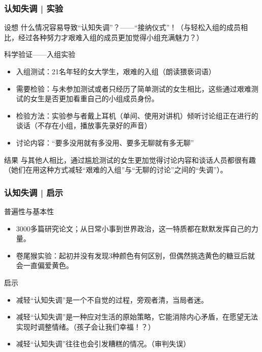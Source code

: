 \begin{frame}
  \frametitle{认知失调 | 实验}
  \begin{block}{设想}
什么情况容易导致“认知失调”？——“接纳仪式”！（与轻松入组的成员相比，经过各种努力才艰难入组的成员更加觉得小组充满魅力？）
  \end{block}
  \vspace{-0.6em}
  \pause
  \begin{block}{科学验证——入组实验}
    \begin{itemize}
      \item 入组测试：21名年轻的女大学生，艰难的入组（朗读猥亵词语）
      \item 需要检验：与未参加测试或者只经历了简单测试的女生相比，这些通过艰难测试的女生是否更加看重自己的小组成员身份。
      \item 检验方法：实验参与者戴上耳机（单间、使用对讲机）倾听讨论组正在进行的谈话（不存在小组，播放事先录好的声音）
      \item 讨论内容：“要多没用就有多没用、要多无聊就有多无聊”
    \end{itemize}
  \end{block}
  \vspace{-0.6em}
  \pause
  \begin{block}{结果}
与其他人相比，通过尴尬测试的女生更加觉得讨论内容和谈话人员都很有趣（她们在用这种方式减轻“艰难的入组”与“无聊的讨论”之间的“失调”）。
  \end{block}
\end{frame}

\begin{frame}
  \frametitle{认知失调 | 启示}
  \begin{block}{普遍性与基本性}
    \begin{itemize}
      \item 3000多篇研究论文；从日常小事到世界政治，这一特质都在默默发挥自己的力量。
      \item 卷尾猴实验：起初并没有发现3种颜色有何区别，但偶然挑选黄色的糖豆后就会一直偏爱黄色。
    \end{itemize}
  \end{block}
  \pause
  \begin{block}{启示}
    \begin{itemize}
      \item 减轻“认知失调”是一个不自觉的过程，旁观者清，当局者迷。
      \item 减轻“认知失调”是一种应对生活的原始策略，它能消除内心矛盾，在愿望无法实现时调整情绪。（孩子会让我们幸福！？）
      \item 减轻“认知失调”往往也会引发糟糕的情况。（审判失误）
    \end{itemize}
  \end{block}
\end{frame}

